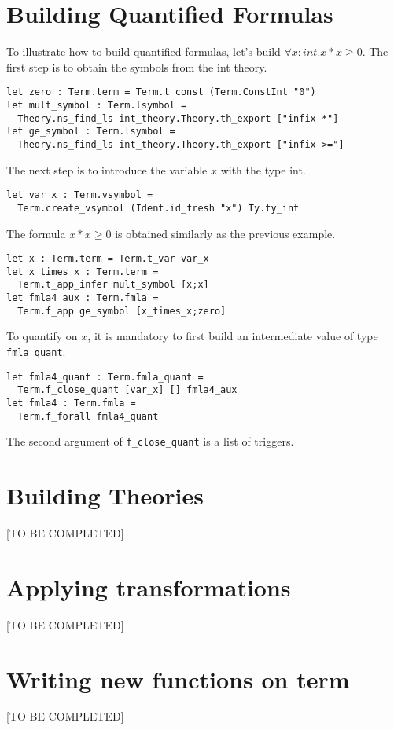 \section{Building Quantified Formulas}

To illustrate how to build quantified formulas, let's build $\forall x:int. x*x \geq 0$. The first step is to obtain the symbols from the int theory.
\begin{verbatim}
let zero : Term.term = Term.t_const (Term.ConstInt "0")
let mult_symbol : Term.lsymbol = 
  Theory.ns_find_ls int_theory.Theory.th_export ["infix *"]
let ge_symbol : Term.lsymbol = 
  Theory.ns_find_ls int_theory.Theory.th_export ["infix >="]
\end{verbatim}
The next step is to introduce the variable $x$ with the type int.
\begin{verbatim}
let var_x : Term.vsymbol = 
  Term.create_vsymbol (Ident.id_fresh "x") Ty.ty_int
\end{verbatim}
The formula $x*x \geq 0$ is obtained similarly as the previous example.
\begin{verbatim}
let x : Term.term = Term.t_var var_x
let x_times_x : Term.term = 
  Term.t_app_infer mult_symbol [x;x] 
let fmla4_aux : Term.fmla = 
  Term.f_app ge_symbol [x_times_x;zero]
\end{verbatim}
To quantify on $x$, it is mandatory to first build an intermediate
value of type \texttt{fmla\_quant}.
\begin{verbatim}
let fmla4_quant : Term.fmla_quant = 
  Term.f_close_quant [var_x] [] fmla4_aux
let fmla4 : Term.fmla =
  Term.f_forall fmla4_quant
\end{verbatim}
The second argument of \texttt{f\_close\_quant} is a list of triggers.

\section{Building Theories}

[TO BE COMPLETED]

\section{Applying transformations}

[TO BE COMPLETED]

\section{Writing new functions on term}

[TO BE COMPLETED]




